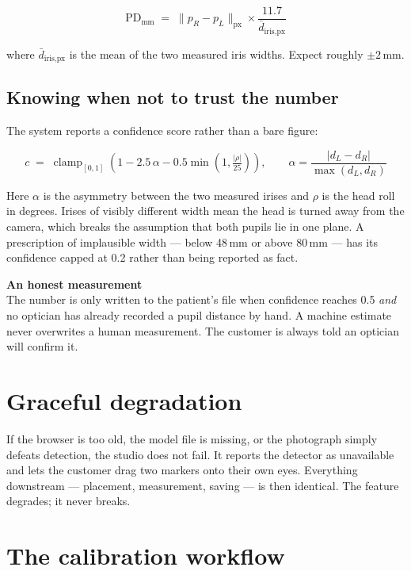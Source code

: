\documentclass[11pt,a4paper]{report}
\newcommand{\keybox}[2]{%
  \begin{center}
  \begin{minipage}{0.94\textwidth}
  \colorbox{vclight}{\parbox{\dimexpr\textwidth-2\fboxsep}{%
    \vspace{3pt}\textbf{\color{vcblue}#1}\\[3pt]#2\vspace{4pt}}}
  \end{minipage}
  \end{center}}
\begin{document}
\begin{equation}
\text{PD}_{\text{mm}} \;=\;
\lVert p_R - p_L \rVert_{\text{px}} \times
\frac{11.7}{\bar{d}_{\text{iris,px}}}
\end{equation}

where $\bar{d}_{\text{iris,px}}$ is the mean of the two measured iris widths.
Expect roughly $\pm 2$\,mm.

\subsection{Knowing when not to trust the number}

The system reports a confidence score rather than a bare figure:

\begin{equation}
c \;=\; \operatorname{clamp}_{[0,1]}\!\left(
1 - 2.5\,\alpha - 0.5\min\!\left(1, \tfrac{|\rho|}{25}\right)\right),
\qquad
\alpha = \frac{\bigl|d_L - d_R\bigr|}{\max(d_L, d_R)}
\end{equation}

Here $\alpha$ is the asymmetry between the two measured irises and $\rho$ is
the head roll in degrees. Irises of visibly different width mean the head is
turned away from the camera, which breaks the assumption that both pupils lie
in one plane. A prescription of implausible width --- below 48\,mm or above
80\,mm --- has its confidence capped at 0.2 rather than being reported as
fact.

\keybox{An honest measurement}{The number is only written to the patient's
file when confidence reaches 0.5 \emph{and} no optician has already recorded a
pupil distance by hand. A machine estimate never overwrites a human
measurement. The customer is always told an optician will confirm it.}

\section{Graceful degradation}

If the browser is too old, the model file is missing, or the photograph simply
defeats detection, the studio does not fail. It reports the detector as
unavailable and lets the customer drag two markers onto their own eyes.
Everything downstream --- placement, measurement, saving --- is then
identical. The feature degrades; it never breaks.

\section{The calibration workflow}
\end{document}
